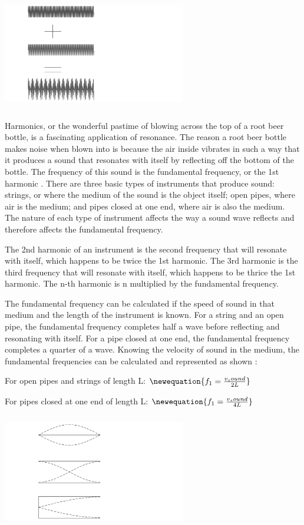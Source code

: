 \documentclass{tufte-handout}
\begin{document}
	\includegraphics[width=8cm, height=5cm]{Beats.png}

Harmonics, or the wonderful pastime of blowing across the top of a root beer bottle, is a fascinating application of resonance. The reason a root beer bottle makes noise when blown into is because the air inside vibrates in such a way that it produces a sound that resonates with itself by reflecting off the bottom of the bottle. The frequency of this sound is the fundamental frequency, or the 1st harmonic \cite{Harmony}. There are three basic types of instruments that produce sound: strings, or where the medium of the sound is the object itself; open pipes, where air is the medium; and pipes closed at one end, where air is also the medium. The nature of each type of instrument affects the way a sound wave reflects and therefore affects the fundamental frequency.

The 2nd harmonic of an instrument is the second frequency that will resonate with itself, which happens to be twice the 1st harmonic. The 3rd harmonic is the third frequency that will resonate with itself, which happens to be thrice the 1st harmonic. The n-th harmonic is n multiplied by the fundamental frequency.

The fundamental frequency can be calculated if the speed of sound in that medium and the length of the instrument is known. For a string and an open pipe, the fundamental frequency completes half a wave before reflecting and resonating with itself. For a pipe closed at one end, the fundamental frequency completes a quarter of a wave. Knowing the velocity of sound in the medium, the fundamental frequencies can be calculated and represented as shown \cite{Harmony}:

For open pipes and strings of length L: $\newequation{f_1=\frac{v_sound}{2L}}$

For pipes closed at one end of length L: $\newequation{f_1=\frac{v_sound}{4L}}$

\includegraphics[width=8cm, height=5cm]{Harmonics.png}
	
\end{document}

